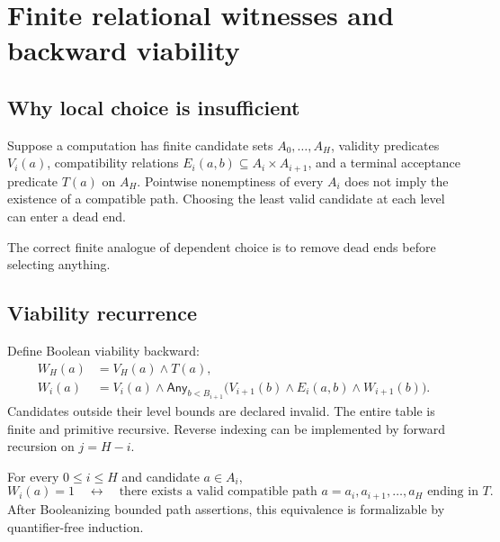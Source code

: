 \section{Finite relational witnesses and backward viability}\label{sec:relational}

\subsection{Why local choice is insufficient}

Suppose a computation has finite candidate sets \(A_0,\ldots,A_H\), validity predicates \(V_i(a)\), compatibility relations \(E_i(a,b)\subseteq A_i\times A_{i+1}\), and a terminal acceptance predicate \(T(a)\) on \(A_H\).  Pointwise nonemptiness of every \(A_i\) does not imply the existence of a compatible path.  Choosing the least valid candidate at each level can enter a dead end.

The correct finite analogue of dependent choice is to remove dead ends before selecting anything.

\subsection{Viability recurrence}

Define Boolean viability backward:
\begin{align*}
 W_H(a)&=V_H(a)\wedge T(a),\\
 W_i(a)&=V_i(a)\wedge
     \mathsf{Any}_{b<B_{i+1}}\bigl(V_{i+1}(b)\wedge E_i(a,b)\wedge W_{i+1}(b)\bigr).
\end{align*}
Candidates outside their level bounds are declared invalid.  The entire table is finite and primitive recursive.  Reverse indexing can be implemented by forward recursion on \(j=H-i\).

\begin{theorem}\label{thm:viability}
For every \(0\le i\le H\) and candidate \(a\in A_i\),
\[
 W_i(a)=1
 \quad\leftrightarrow\quad
 \text{there exists a valid compatible path }a=a_i,a_{i+1},\ldots,a_H
 \text{ ending in }T.
\]
After Booleanizing bounded path assertions, this equivalence is formalizable by quantifier-free induction.
\end{theorem}

